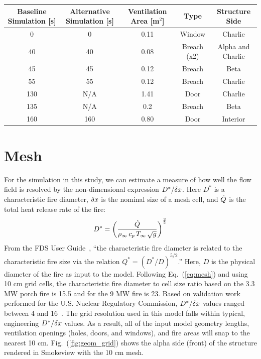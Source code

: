 \documentclass[11pt,oneside]{book}
\begin{document}
\begin{table}
\centering
{}\label{tab:vents}
\begin{tabular}{ccccc}
\toprule[1.5pt]
Baseline Simulation [s] & Alternative Simulation [s] & Ventilation Area [m$^2$] & Type & Structure Side \\
\midrule
0    &  0   & 0.11 & Window      & Charlie \\
40    &  40   & 0.08 & Breach (x2) & Alpha and Charlie \\
45    &  45   & 0.12 & Breach      & Beta \\
55    &  55   & 0.12 & Breach      & Charlie \\     
130   &  N/A  & 1.41 & Door        & Charlie \\
135   &  N/A  & 0.2  & Breach      & Beta \\        
160   &  160  & 0.80 & Door        & Interior \\
\bottomrule[1.25pt]
\end{tabular}\par
\end{table}

\section{Mesh}
\label{mesh}

For the simulation in this study, we can estimate a measure of how well the flow field is resolved by the non-dimensional expression $D^*/\delta x$. Here $D^*$ is a characteristic fire diameter, $\delta x$ is the nominal size of a mesh cell, and $\dot{Q}$ is the total heat release rate of the fire:
\begin{equation}
D^* = \left(
     \frac{\dot{Q}}{\rho_\infty \, c_p \, T_\infty \, \sqrt{g} }
     \right)^\frac{2}{5} 
\label{eq:mesh}
\end{equation}   
From the FDS User Guide~\cite{FDS_Users_Guide}, ``the characteristic fire diameter is related to the characteristic fire size via the
relation $Q^* = (D^*/D)^{5/2}$.'' Here, $D$ is the physical diameter of the fire as input to the model. Following Eq.~(\ref{eq:mesh}) and using 10 cm grid cells, the characteristic fire diameter to cell size ratio based on the 3.3 MW porch fire is 15.5 and for the 9 MW fire is 23. Based on validation work performed for the U.S. Nuclear Regulatory Commission, $D^*/\delta x$ values ranged between 4 and 16~\cite{NUREG_1824}. The grid resolution used in this model falls within typical, engineering $D^*/\delta x$ values. As a result, all of the input model geometry lengths, ventilation openings (holes, doors, and windows), and fire areas will snap to the nearest 10 cm. Fig.~(\ref{fig:geom_grid}) shows the 
alpha side (front) of the structure rendered in Smokeview with the 10 cm mesh.
\end{document}
